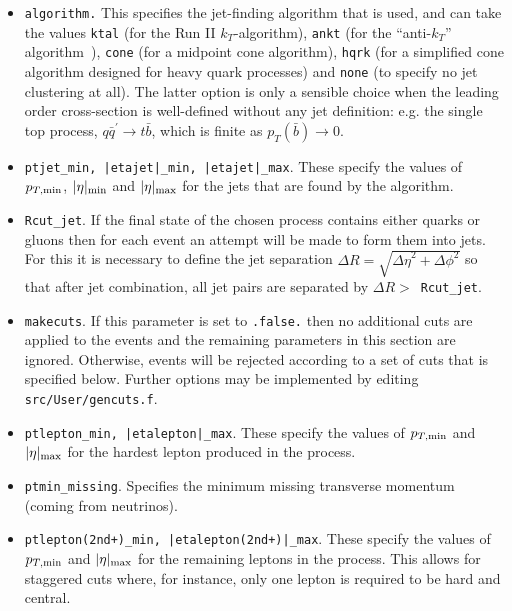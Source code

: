 \documentclass[12pt]{article}
\begin{document}
\begin{itemize}
\item {\tt algorithm.} This specifies the jet-finding algorithm that
is used, and can take the values
{\tt ktal} (for the Run II $k_T$-algorithm), {\tt ankt} (for the
``anti-$k_T$'' algorithm~\cite{Cacciari:2008}), {\tt cone} (for
a midpoint cone algorithm), {\tt hqrk} (for a simplified cone
algorithm designed for heavy quark processes) and {\tt none} (to
specify no jet clustering at all). The latter option is only a
sensible choice when the leading order cross-section is well-defined
without any jet definition: e.g. the single top process,
$q{\bar q^\prime} \to t{\bar b}$, which is finite as
$p_T({\bar b}) \to 0$.

\item {\tt ptjet\_min, |etajet|\_min, |etajet|\_max}. These specify the values
of $p_{T,{\rm min}}$, $|\eta|_{\rm min}$ and $|\eta|_{\rm max}$ for the
jets that are found by the algorithm. 

\item {\tt Rcut\_jet}. If the final state of the chosen process contains
either quarks or gluons then for each event an attempt will be made
to form them into jets. For this it is necessary to define the
jet separation $\Delta R=\sqrt{{\Delta \eta}^2 + {\Delta \phi}^2}$
so that after jet combination, all jet pairs are separated by
$\Delta R >$~{\tt Rcut\_jet}.

\item {\tt makecuts}. If this parameter is set to {\tt .false.} then
no additional cuts are applied to the events and the remaining
parameters in this section are ignored. Otherwise, events will
be rejected according to a set of cuts that is specified below.
Further options may be implemented by editing {\tt src/User/gencuts.f}.

\item {\tt ptlepton\_min, |etalepton|\_max}. These specify the values
of $p_{T,{\rm min}}$ and $|\eta|_{\rm max}$ for the hardest lepton produced
in the process.

\item {\tt ptmin\_missing}. Specifies the minimum missing transverse
momentum (coming from neutrinos).

\item {\tt ptlepton(2nd+)\_min, |etalepton(2nd+)|\_max}. These specify
the values of $p_{T,{\rm min}}$ and $|\eta|_{\rm max}$ for the remaining
leptons in the process. This allows for staggered cuts where, for
instance, only one lepton is required to be hard and central.


\end{itemize}
\end{document}
